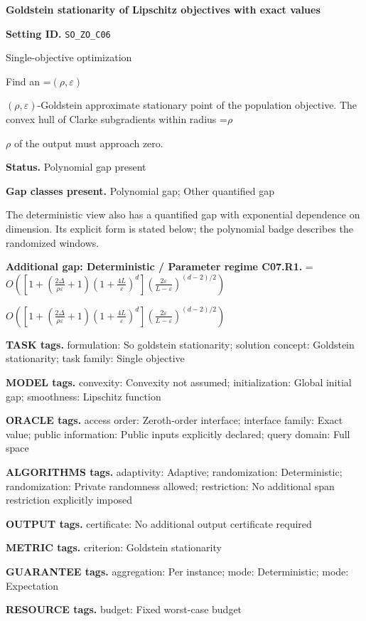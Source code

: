 \documentclass[10pt,a4paper]{article}
\newcommand{\AtlasMath}[1]{\par\begingroup\centering\setbox0=\hbox{$\displaystyle #1$}\ifdim\wd0>1.4\linewidth\typeout{ATLAS WIDE FORMULA: \the\wd0}\fi\ifdim\wd0>\linewidth\resizebox{\linewidth}{!}{\box0}\else\box0\fi\par\endgroup}
\newcommand{\AtlasInlineMath}[1]{\begingroup\setbox0=\hbox{$#1$}\ifdim\wd0>.4\linewidth\endgroup\AtlasMath{#1}\else\endgroup$#1$\fi}
\begin{document}
\raggedright

{\LARGE\bfseries\sffamily\color{AtlasNavy} Goldstein stationarity of Lipschitz objectives with exact values\par}\vspace{5pt}
\textbf{Setting ID.} \texttt{SO\_\allowbreak{}ZO\_\allowbreak{}C06}

Single-objective optimization

Find an \AtlasInlineMath{(\rho,\varepsilon)}-Goldstein approximate stationary point of the population objective. The convex hull of Clarke subgradients within radius \AtlasInlineMath{\rho} of the output must approach zero.

\textbf{Status.} Polynomial gap present

\textbf{Gap classes present.} Polynomial gap; Other quantified gap

The deterministic view also has a quantified gap with exponential dependence on dimension. Its explicit form is stated below; the polynomial badge describes the randomized windows.

\textbf{Additional gap: Deterministic / Parameter regime C07.R1.} \AtlasInlineMath{O\!\left(\left[1+\left(\frac{2\Delta}{\rho\varepsilon}+1\right)\left(1+\frac{4L}{\varepsilon}\right)^d\right]\left(\frac{2\varepsilon}{L-\varepsilon}\right)^{(d-2)/2}\right)}

\textbf{TASK tags.} formulation: So goldstein stationarity; solution concept: Goldstein stationarity; task family: Single objective

\textbf{MODEL tags.} convexity: Convexity not assumed; initialization: Global initial gap; smoothness: Lipschitz function

\textbf{ORACLE tags.} access order: Zeroth-order interface; interface family: Exact value; public information: Public inputs explicitly declared; query domain: Full space

\textbf{ALGORITHMS tags.} adaptivity: Adaptive; randomization: Deterministic; randomization: Private randomness allowed; restriction: No additional span restriction explicitly imposed

\textbf{OUTPUT tags.} certificate: No additional output certificate required

\textbf{METRIC tags.} criterion: Goldstein stationarity

\textbf{GUARANTEE tags.} aggregation: Per instance; mode: Deterministic; mode: Expectation

\textbf{RESOURCE tags.} budget: Fixed worst-case budget
\end{document}
